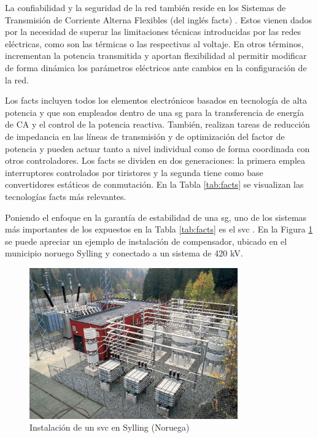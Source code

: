 \vspace{3mm}

La confiabilidad y la seguridad de la red también reside en los Sistemas de Transmisión de Corriente Alterna Flexibles (del inglés \gls{facts}) \cite{facts} \cite{facts3}. Estos vienen dados por la necesidad de superar las limitaciones técnicas introducidas por las redes eléctricas, como son las térmicas o las respectivas al voltaje. En otros términos, incrementan la potencia transmitida y aportan flexibilidad al permitir modificar de forma dinámica los parámetros eléctricos ante cambios en la configuración de la red. 

\vspace{3mm}

Los \gls{facts} \cite{facts2} \cite{facts3} incluyen todos los elementos electrónicos basados en tecnología de alta potencia y que son empleados dentro de una \gls{sg} para la transferencia de energía de CA y el control de la potencia reactiva. También, realizan tareas de reducción de impedancia en las líneas de transmisión y de optimización del factor de potencia y pueden actuar tanto a nivel individual como de forma coordinada con otros controladores. Los \gls{facts} se dividen en dos generaciones: la primera emplea interruptores controlados por tiristores y la segunda tiene como base convertidores estáticos de conmutación. En la Tabla \ref{tab:facts} se visualizan las tecnologías \gls{facts} más relevantes. 

\vspace{3mm}

Poniendo el enfoque en la garantía de estabilidad de una \gls{sg}, uno de los sistemas más importantes de los expuestos en la Tabla \ref{tab:facts} es el \gls{svc} \cite{facts}. En la Figura \ref{fig:svc} se puede apreciar un ejemplo de instalación de compensador, ubicado en el municipio noruego Sylling y conectado a un sistema de 420 kV.

\vspace{3mm}

\begin{figure}[h!]
  \centering
  \includegraphics[width=0.8\textwidth]{img/teoria/svc.png}
  \caption{Instalación de un \acrshort{svc} en Sylling (Noruega) \cite{facts}}
  \label{fig:svc}
\end{figure}

